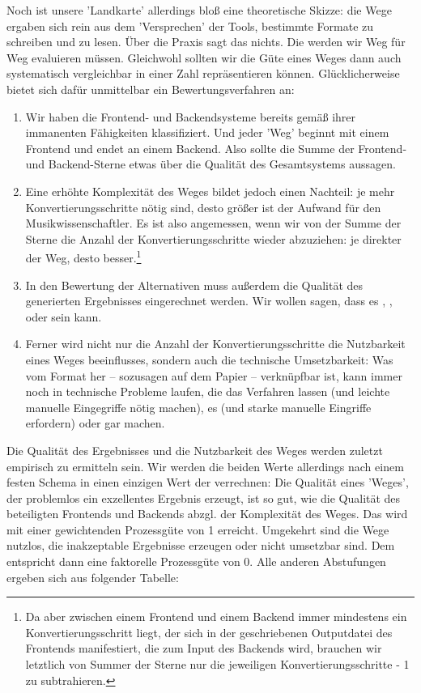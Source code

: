 Noch ist unsere 'Landkarte' allerdings bloß eine theoretische Skizze: die Wege
ergaben sich rein aus dem 'Versprechen' der Tools, bestimmte Formate zu
schreiben und zu lesen. Über die Praxis sagt das nichts. Die werden wir Weg für
Weg evaluieren müssen. Gleichwohl sollten wir die Güte eines Weges dann auch
systematisch vergleichbar in einer Zahl repräsentieren können. Glücklicherweise
bietet sich dafür unmittelbar ein Bewertungsverfahren an:

\begin{enumerate}
  \item Wir haben die Frontend- und Backendsysteme bereits gemäß ihrer immanenten
  Fähigkeiten klassifiziert. Und jeder 'Weg' beginnt mit einem Frontend und endet
  an einem Backend. Also sollte die Summe der Frontend- und Backend-Sterne etwas
  über die Qualität des Gesamtsystems aussagen.
  \item Eine erhöhte Komplexität des Weges bildet jedoch einen Nachteil: je mehr
  Konvertierungsschritte nötig sind, desto größer ist der Aufwand für den
  Musikwissenschaftler. Es ist also angemessen, wenn wir von der Summe der
  Sterne die Anzahl der Konvertierungsschritte wieder abzuziehen: je direkter
  der Weg, desto besser.\footnote{Da aber zwischen einem Frontend und einem
  Backend immer mindestens ein Konvertierungsschritt liegt, der sich in der
  geschriebenen Outputdatei des Frontends manifestiert, die zum Input des
  Backends wird, brauchen wir letztlich von Summer der Sterne nur die jeweiligen
  Konvertierungsschritte - 1 zu subtrahieren.}
  \item In den Bewertung der Alternativen muss außerdem die Qualität des
  generierten Ergebnisses eingerechnet werden. Wir wollen sagen, dass es
  , ,  oder 
  sein kann.
  \item Ferner wird nicht nur die Anzahl der Konvertierungsschritte die
  Nutzbarkeit eines Weges beeinflusses, sondern auch die technische
  Umsetzbarkeit: Was vom Format her -- sozusagen auf dem Papier --
   verknüpfbar ist, kann immer noch in technische Probleme
  laufen, die das Verfahren  lassen (und leichte manuelle
  Eingegriffe nötig machen), es  (und starke manuelle Eingriffe
  erfordern) oder gar  machen.
\end{enumerate}
 
Die Qualität des Ergebnisses und die Nutzbarkeit des Weges werden zuletzt
empirisch zu ermitteln sein. Wir werden die beiden Werte allerdings nach einem
festen Schema in einen einzigen Wert der  verrechnen: Die Qualität
eines 'Weges', der problemlos ein exzellentes Ergebnis erzeugt, ist so gut, wie
die Qualität des beteiligten Frontends und Backends abzgl. der Komplexität des
Weges. Das wird mit einer gewichtenden Prozessgüte von 1 erreicht. Umgekehrt
sind die Wege nutzlos, die inakzeptable Ergebnisse erzeugen oder nicht umsetzbar
sind. Dem entspricht dann eine faktorelle Prozessgüte von 0. Alle anderen
Abstufungen ergeben sich aus folgender Tabelle:

